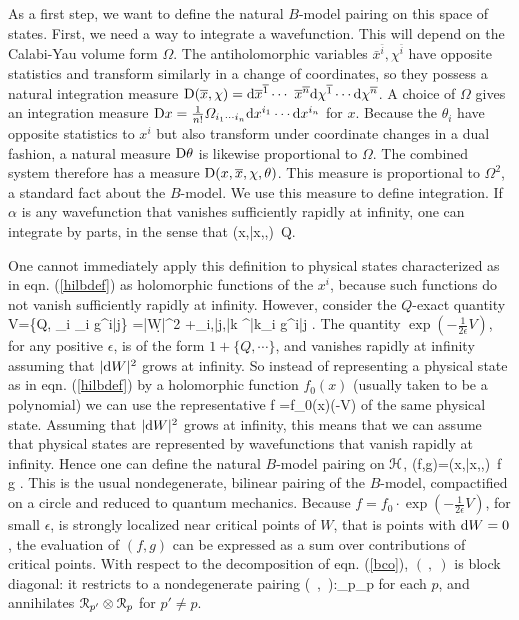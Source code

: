\documentclass[11pt,a4paper]{article}
\begin{document}
As a first step, we want to define the natural $B$-model
pairing on this space of states.   First, we need a way to integrate a wavefunction.   This will depend on the Calabi-Yau 
volume form $\varOmega$.  The antiholomorphic variables $\bar x^{\bar i}, \chi^{\bar i}$ have opposite statistics and transform similarly in
a change of coordinates, so they possess a natural integration measure ${\mathrm D}(\overline x,\chi)=\mathrm d \overline x^{\overline 1}\cdots \ \overline x^{\overline n}\mathrm d\chi^{\overline 1}\cdots\mathrm d\chi^{\overline n}$.
   A choice of $\varOmega$ gives an integration measure ${\mathrm D} x=\frac{1}{n!} \varOmega_{i_1\cdots i_n}\mathrm d x^{i_1}\cdots \mathrm d x^{i_n}$ for
 $x$.   Because the $\theta_i$ have opposite statistics to $x^i$ but also transform under coordinate changes in a dual fashion, a natural measure ${\mathrm D}\theta$
 is likewise proportional to $\varOmega$.   The combined system therefore has a measure ${\mathrm D}(x,\overline x, \chi,\theta)$.  This measure is proportional to $\varOmega^2$, a standard fact about the $B$-model.
We use this measure to define integration.   If $\alpha$ is any wavefunction that vanishes sufficiently rapidly at infinity, 
 one can integrate by parts, in the sense that
 \be\label{intparts} \int \dD(x,\bar x,\chi,\theta)\, Q.\ee

One cannot immediately apply this definition to physical states characterized as in eqn. (\ref{hilbdef}) as holomorphic functions of the $x^i$, because
such functions do not vanish sufficiently rapidly at infinity.   However, consider the $Q$-exact quantity
\be\label{zoro} V=\left\{Q, \sum_i \theta_i g^{i\bar j}\right\} =\left|\d W\right|^2 +\sum_{i,\bar j,\bar k} \chi^{\bar k}\theta_i g^{i\bar j} .  \ee  
The quantity $\exp\left(-\frac{1}{2\epsilon}V\right)$, for any positive $\epsilon$, is of the form $1+\{Q,\cdots\}$, and vanishes rapidly at infinity assuming that
$|\mathrm d W|^2$ grows at infinity.   So instead of representing a physical state  as in eqn. (\ref{hilbdef}) by a holomorphic function $f_0(x)$ (usually taken to be a polynomial)
we can use the representative 
\be\label{todo}f =f_0(x)\cdot \exp\left(-V\right)\ee
 of the same physical state.   Assuming that $|\mathrm d W|^2$ grows at infinity, this  means that we can assume that physical
states are represented by wavefunctions that vanish rapidly at infinity.   Hence one can define the natural $B$-model pairing on ${\mathcal H}$,
\be\label{zinparts} (f,g)=\int \dD(x,\bar x,\chi,\theta)\, f g . \ee
This is the usual nondegenerate, bilinear pairing of the $B$-model, compactified on a circle and reduced to quantum mechanics.   
 Because $f =f_0\cdot \exp\left(-\frac{1}{2\epsilon}V\right)$, for small $\epsilon$,  is strongly localized near critical points of $W$, that is points with $\mathrm d W=0$,
the evaluation of $(f,g)$ can be expressed as a sum over contributions of critical points.   With respect to the decomposition of eqn. (\ref{bco}),
$(~,~)$ is block diagonal: it restricts to a nondegenerate pairing
\be\label{restro}(~,~):\RR_p\otimes \RR_p\to \C\ee
for each $p$, and annihilates ${\mathcal R}_{p'}\otimes {\mathcal R}_p$ for $p'\not=p$.
\end{document}
